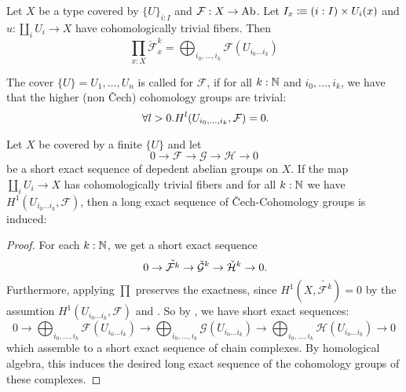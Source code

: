 \begin{remark}
  \label{cech-sheaf-to-complex}
  Let $X$ be a type covered by $\{U\}_{i:I}$ and $\mathcal F : X\to \operatorname{Ab}$.
  Let $I_x\vcentcolon\mspace{-1.2mu}\equiv (i:I)\times U_i(x)$ and $u:\coprod_i U_i\to X$ have cohomologically trivial fibers.
  Then 
  \[
    \prod_{x:X} \check{\mathcal F}^k_x=\bigoplus_{i_0,\dots,i_k}\mathcal F(U_{i_0\dots i_k})
  \]
\end{remark}

\begin{definition}
  The cover $\{U\}=U_1,\dots,U_n$ is called  for $\mathcal F$,
  if for all $k:\mathbb{N}$ and $i_0,\dots,i_k$, we have that the higher (non Čech) cohomology groups are trivial:
  \[
    \forall l>0. H^l(U_{i_0,\dots,i_k},\mathcal F)=0\rlap{.}
  \]
\end{definition}

\begin{theorem}%
  \label{chech-les}
  Let $X$ be covered by a finite $\{U\}$ and let 
  \[ 0\to \mathcal F\to \mathcal G\to \mathcal H\to 0\]
  be a short exact sequence of depedent abelian groups on $X$.
  If the map $\coprod_i U_i\to X$ has cohomologically trivial fibers and for all $k:\mathbb{N}$ we have $H^1(U_{i_0\dots i_k},\mathcal F)$,
  then a long exact sequence of \v{C}ech-Cohomology groups is induced:
  \begin{center}
  \end{center}
\end{theorem}

\begin{proof}
  For each $k:\mathbb{N}$, we get a short exact sequence
  \[
    0\to \check{\mathcal F^k}\to \check{\mathcal G}^k\to \check{\mathcal H}^k\to 0
    \rlap{.}
  \]
  Furthermore, applying $\prod$ preserves the exactness, since $H^1(X,\check{\mathcal F^k})=0$
  by the assumtion $H^1(U_{i_0\dots i_k},\mathcal F)$ and .
  So by , we have short exact sequences:
  \[
  0\to \bigoplus_{i_0,\dots,i_k}\mathcal F(U_{i_0\dots i_k}) \to \bigoplus_{i_0,\dots,i_k}\mathcal G(U_{i_0\dots i_k}) \to \bigoplus_{i_0,\dots,i_k}\mathcal H(U_{i_0\dots i_k})\to 0
  \]
  which assemble to a short exact sequence of chain complexes.
  By homological algebra, this induces the desired long exact sequence of the cohomology groups of these complexes.
\end{proof}

